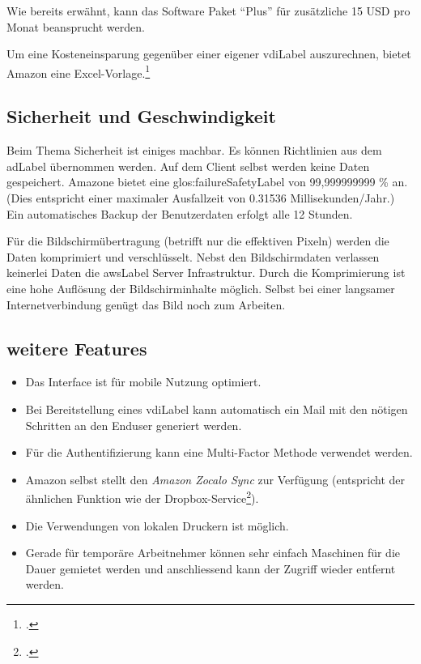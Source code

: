 Wie bereits erwähnt, kann das Software Paket "`Plus"' für zusätzliche 15 USD pro Monat beansprucht werden.

Um eine Kosteneinsparung gegenüber einer eigener \Gls{vdiLabel} auszurechnen, bietet Amazon eine Excel-Vorlage.\footcite{TCO_Comparison_Amazon_WorkSpaces_and_Traditional_Virtual_Desktop_Infrastructure_VDI_2014-11-15}

\subsection{Sicherheit und Geschwindigkeit}
Beim Thema Sicherheit ist einiges machbar.
Es können Richtlinien aus dem \Gls{adLabel} übernommen werden.
Auf dem Client selbst werden keine Daten gespeichert.
Amazone bietet eine \Gls{glos:failureSafetyLabel} von 99,999999999 \% an. (Dies entspricht einer maximaler Ausfallzeit von 0.31536 Millisekunden/Jahr.)
Ein automatisches Backup der Benutzerdaten erfolgt alle 12 Stunden.

Für die Bildschirmübertragung (betrifft nur die effektiven Pixeln) werden die Daten komprimiert und verschlüsselt.
Nebst den Bildschirmdaten verlassen keinerlei Daten die \Gls{awsLabel} Server Infrastruktur.
Durch die Komprimierung ist eine hohe Auflösung der Bildschirminhalte möglich. Selbst bei einer langsamer Internetverbindung genügt das Bild noch zum Arbeiten.

\subsection{weitere Features}
\begin{itemize}
	\item Das Interface ist für mobile Nutzung optimiert.
	\item Bei Bereitstellung eines \Gls{vdiLabel} kann automatisch ein Mail mit den nötigen Schritten an den Enduser generiert werden.
	\item Für die Authentifizierung kann eine Multi-Factor Methode verwendet werden.
	\item Amazon selbst stellt den \textit{Amazon Zocalo Sync} zur Verfügung (entspricht der ähnlichen Funktion wie der Dropbox-Service\footcite{Dropbox_2014-11-15}).
	\item Die Verwendungen von lokalen Druckern ist möglich.
	\item Gerade für temporäre Arbeitnehmer können sehr einfach Maschinen für die Dauer gemietet werden und anschliessend kann der Zugriff wieder entfernt werden.
\end{itemize}

